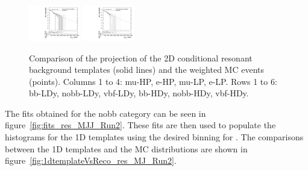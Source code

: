 \begin{figure}[htbp]
  \includegraphics[width=0.2\textwidth]{fig/analysisAppendix/templateVsReco_res_r0_MVV_mu_LP_vbf_HDy.pdf}
  \includegraphics[width=0.2\textwidth]{fig/analysisAppendix/templateVsReco_res_r0_MVV_e_LP_vbf_HDy.pdf}\\
  \caption{
    Comparison of the \MVV projection of the 2D conditional resonant background templates (solid lines) and the weighted MC events (points).
    Columns 1 to 4: mu-HP, e-HP, mu-LP, e-LP.
    Rows 1 to 6: bb-LDy, nobb-LDy, vbf-LDy, bb-HDy, nobb-HDy, vbf-HDy.
  }
  \label{fig:condTemplateVscondReco_res_MVV_Run2}
\end{figure}

The fits obtained for the nobb category can be seen in figure~\ref{fig:fits_res_MJJ_Run2}.
These fits are then used to populate the histograms for the 1D templates using the desired binning for \MJ.
The comparisons between the 1D templates and the MC distributions are shown in figure~\ref{fig:1dtemplateVsReco_res_MJ_Run2}.

